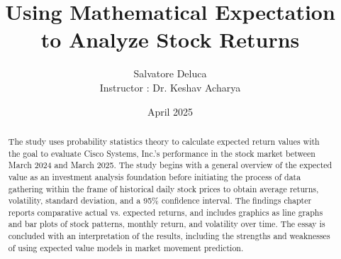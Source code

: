 \documentclass[12]{amsart}
\title{Using Mathematical Expectation to Analyze Stock Returns}
\author{ Salvatore Deluca \\
Instructor : Dr. Keshav Acharya}
\date{April 2025}
\begin{document}
\maketitle
{}
\vspace*{\fill}
\newpage
\begin{flushleft}
\begin{abstract}
The study uses probability statistics theory to calculate expected return values with the goal to evaluate Cisco Systems, Inc.'s performance in the stock market between March 2024 and March 2025. The study begins with a general overview of the expected value as an investment analysis foundation before initiating the process of data gathering within the frame of historical daily stock prices to obtain average returns, volatility, standard deviation, and a 95\% confidence interval. The findings chapter reports comparative actual vs. expected returns, and includes graphics as line graphs and bar plots of stock patterns, monthly return, and volatility over time. The essay is concluded with an interpretation of the results, including the strengths and weaknesses of using expected value models in market movement prediction.
\end{abstract}


\end{flushleft}
\end{document}

